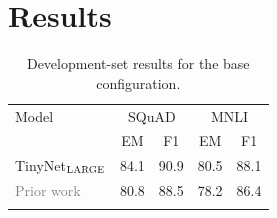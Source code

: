 \documentclass{article}
\newcommand{\tsep}	{\bstrut \\ \thinline}
\newcommand\tstrut{\rule{0pt}{2.6ex}}
\newcommand\ourmodel{TinyNet$_{\textsc{LARGE}}$}
\newcommand{\demph}[1]{\textcolor{gray}{#1}}
\begin{document}
\section{Results}

\begin{table}
\begin{tabular}{lcccc}
Model & \multicolumn{2}{c}{SQuAD} & \multicolumn{2}{c}{MNLI} \tstrut \\
 & EM & F1 & EM & F1 \tsep
\ourmodel & 84.1 & 90.9 & 80.5 & 88.1 \tsep
\demph{Prior work} & 80.8 & 88.5 & 78.2 & 86.4 \tsep
\end{tabular}
\caption{Development-set results for the base configuration.}
\end{table}
\end{document}
